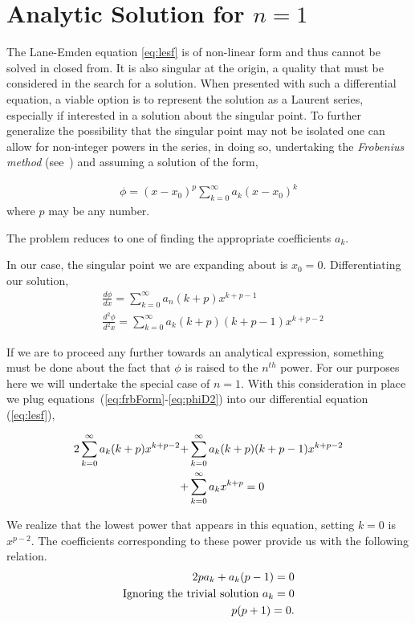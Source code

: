\documentclass[12pt, manuscript]{article}
\begin{document}
\section*{Analytic Solution for $n = 1$}
The Lane-Emden equation \eqref{eq:lesf} is of non-linear form and thus cannot be solved in closed from. It is also singular at the origin, a quality that must be considered in the search for a solution. When presented with such a differential equation, a viable option is to represent the solution as a Laurent series, especially if interested in a solution about the singular point. To further generalize the possibility that the singular point may not be isolated one can allow for non-integer powers in the series, in doing so, undertaking the \emph{Frobenius method} (see~\cite{lea}) and assuming a solution of the form,

\begin{align}
\phi = (x-x_{0})^{p}\sum_{k=0}^{\infty}a_{k}(x-x_{0})^{k}\label{eq:frbForm}
\end{align}
\noindent where $p$ may be any number. \par

\noindent The problem reduces to one of finding the appropriate coefficients $a_{k}$.\par

\noindent In our case, the singular point we are expanding about is $x_{0}=0$. Differentiating our solution,
\begin{align}
&\frac{d\phi}{dx} = \sum_{k=0}^{\infty}a_{n}(k+p)x^{k+p-1}\label{eq:phiD1}\\
&\frac{d^{2}\phi}{d^{2}x} = \sum_{k=0}^{\infty}a_{k}(k+p)(k+p-1)x^{k+p-2}\label{eq:phiD2}
\end{align}

\noindent If we are to proceed any further towards an analytical expression, something must be done about the fact that $\phi$ is raised to the $n^{th}$ power. For our purposes here we will undertake the special case of $n=1$. With this consideration in place we plug equations~(\eqref{eq:frbForm}-\eqref{eq:phiD2}) into our differential equation (\eqref{eq:lesf}),

\begin{align}
2 \sum_{k=0}^{\infty}a_{k}(k+p)x^{k+p-2}+ &\sum_{k=0}^{\infty}a_{k}(k+p)(k+p-1)x^{k+p-2}\\ +&\sum_{k=0}^{\infty}a_{k}x^{k+p} =0\notag
\end{align}

\noindent We realize that the lowest power that appears in this equation, setting $k=0$ is $x^{p-2}$. The coefficients corresponding to these power provide us with the following relation.
\begin{align}
2pa_{k}+a_{k}(p-1) = 0\notag\\
\text{Ignoring the trivial solution $a_{k}=0$}\notag\\
p(p+1) = 0.
\end{align}
\end{document}
